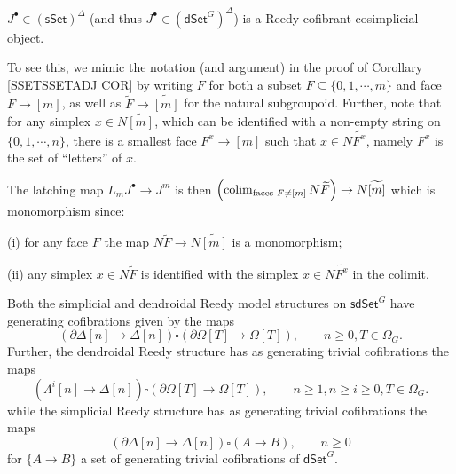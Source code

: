 \documentclass[a4paper,10pt
,draft
]{article}%
\begin{document}
\begin{remark}\label{JREEDYCOF REM}
$J^{\bullet} \in \left(\mathsf{sSet}\right)^{\Delta}$ 
(and thus $J^{\bullet} \in \left(\mathsf{dSet}^G\right)^{\Delta}$) is a Reedy cofibrant cosimplicial object. 

To see this, we mimic the notation (and argument) in the proof of
Corollary \ref{SSETSSETADJ COR} by writing 
$F$ for both a subset $F \subseteq \{0,1,\cdots,m\}$
and face $F \to [m]$, as well as $\widetilde{F} \to \widetilde{[m]}$ for the natural subgroupoid.
Further, note that for any simplex $x \in N\widetilde{[m]}$, which can be identified with a non-empty string on $\{0,1,\cdots,n\}$, there is a smallest face $F^x \to [m]$ such that 
$x \in N\widetilde{F^x}$, namely $F^x$ is the set of ``letters'' of $x$.

The latching map $L_m J^{\bullet} \to J^m$ is then
$
\left(\mathop{\operatorname{colim}}_{\text{faces }F \neq [m]} N \widetilde{F}\right) \to N\widetilde{[m]}
$
which is monomorphism since:
\begin{inparaenum}
	\item[(i)] for any face $F$ the map $N \widetilde{F} \to N\widetilde{[m]}$ is a monomorphism;
	\item[(ii)] any simplex $x \in N \widetilde{F}$ is identified with the simplex $x \in N \widetilde{F^x}$ in the colimit.
\end{inparaenum}
\end{remark}


\begin{proposition}
	Both the simplicial and dendroidal Reedy model structures on 
	$\mathsf{sdSet}^G$ have generating cofibrations given by the maps
\begin{equation}\label{JOINTCOF EQ}
	\left(\partial \Delta [n] \to \Delta[n]\right)
		\square
	\left(\partial \Omega[T] \to \Omega[T]\right),
	\qquad
	n\geq 0, T \in \Omega_G.
\end{equation}
  Further, the dendroidal Reedy structure has as generating trivial cofibrations the maps
\begin{equation}\label{DENDTRIVCOF EQ}
	\left(\Lambda^i [n] \to \Delta[n]\right)
		\square
	\left(\partial \Omega[T] \to \Omega[T]\right),
	\qquad
 	n\geq 1, n\geq i \geq 0, T \in \Omega_G.
\end{equation}
while the simplicial Reedy structure has as generating trivial cofibrations the maps
\begin{equation}\label{SIMPTRIVCOF EQ}
	\left(\partial \Delta [n] \to \Delta[n]\right)
		\square
	\left(A \to B\right),
	\qquad
	n\geq 0
\end{equation}
for $\{A \to B\}$ a set of generating trivial cofibrations of
$\mathsf{dSet}^G$.
\end{proposition}
\end{document}
